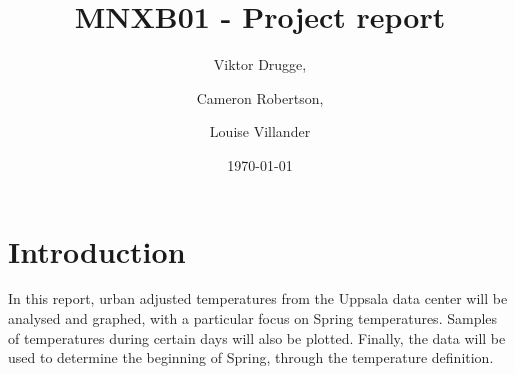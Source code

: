 \documentclass[a4paper,12pt]{article}
\title{\textbf{MNXB01} - Project report}
\date{\today}
\author{Viktor Drugge, \and Cameron Robertson, \and Louise Villander}
\begin{document}
	\maketitle
	\section{Introduction}
	\label{sec:pre}
	In this report, urban adjusted temperatures from the Uppsala data center will be analysed
	and graphed, with a particular focus on Spring temperatures. Samples of temperatures during certain
	days will also be plotted. Finally, the data will be used to determine the beginning of Spring, through
	the temperature definition.
	
	
\end{document}
